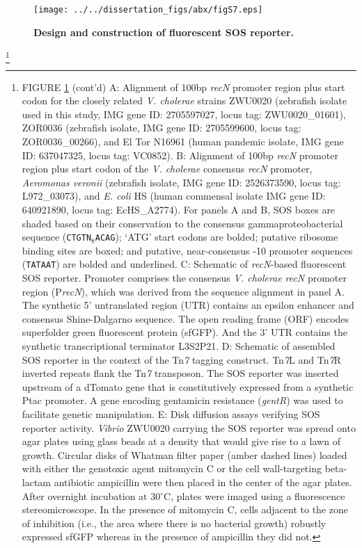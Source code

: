 {{{\begin{figure}[H]
	\centerline{
		\texttt{[image: ../../dissertation\_figs/abx/figS7.eps]}} 
	\caption{\textbf{Design and construction of fluorescent SOS reporter.}}
	\label{fig:figS7}
\end{figure}
{\let\thefootnote\relax\footnote{FIGURE \ref{fig:figS7} (cont'd) A: Alignment of 100bp \textit{recN} promoter region plus start codon for the closely related \textit{V. cholerae} strains ZWU0020 (zebrafish isolate used in this study, IMG gene ID: 2705597027, locus tag: ZWU0020\_01601), ZOR0036 (zebrafish isolate, IMG gene ID: 2705599600, locus tag: ZOR0036\_00266), and El Tor N16961 (human pandemic isolate, IMG gene ID: 637047325, locus tag: VC0852). B: Alignment of 100bp \textit{recN} promoter region plus start codon of the \textit{V. cholerae} consensus \textit{recN} promoter, \textit{Aeromonas veronii} (zebrafish isolate, IMG gene ID: 2526373590, locus tag: L972\_03073), and \textit{E. coli} HS (human commensal isolate IMG gene ID: 640921890, locus tag: EcHS\_A2774). For panels A and B, SOS boxes are shaded based on their conservation to the consensus gammaproteobacterial sequence (\texttt{CTGTN$_8$ACAG}); `ATG' start codons are bolded; putative ribosome binding sites are boxed; and putative, near-consensus -10 promoter sequences (\texttt{TATAAT}) are bolded and underlined. C: Schematic of \textit{recN}-based fluorescent SOS reporter. Promoter comprises the consensus \textit{V. cholerae} \textit{recN} promoter region (P\textit{recN}), which was derived from the sequence alignment in panel A. The synthetic 5' untranslated region (UTR) contains an epsilon enhancer and consensus Shine-Dalgarno sequence. The open reading frame (ORF) encodes superfolder green fluorescent protein (sfGFP). And the 3' UTR contains the synthetic transcriptional terminator L3S2P21. D: Schematic of assembled SOS reporter in the context of the Tn\textit{7} tagging construct. Tn\textit{7}L and Tn\textit{7}R inverted repeats flank the Tn\textit{7} transposon. The SOS reporter was inserted upstream of a dTomato gene that is constitutively expressed from a synthetic Ptac promoter. A gene encoding gentamicin resistance (\textit{gentR}) was used to facilitate genetic manipulation. E: Disk diffusion assays verifying SOS reporter activity. \textit{Vibrio} ZWU0020 carrying the SOS reporter was spread onto agar plates using glass beads at a density that would give rise to a lawn of growth. Circular disks of Whatman filter paper (amber dashed lines) loaded with either the genotoxic agent mitomycin C or the cell wall-targeting beta-lactam antibiotic ampicillin were then placed in the center of the agar plates. After overnight incubation at 30$^{\circ}$C, plates were imaged using a fluorescence stereomicroscope. In the presence of mitomycin C, cells adjacent to the zone of inhibition (i.e., the area where there is no bacterial growth) robustly expressed sfGFP whereas in the presence of ampicillin they did not.}

}}}}
